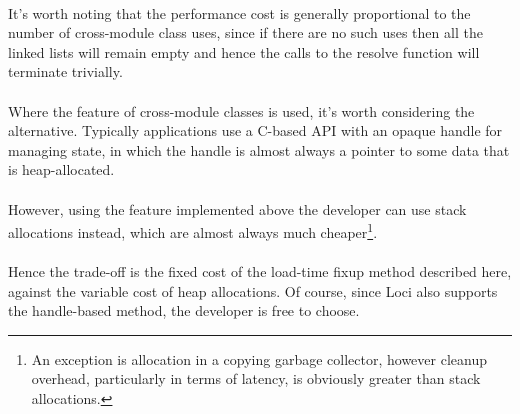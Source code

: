 \documentclass{article}
\begin{document}
\paragraph{}
It's worth noting that the performance cost is generally proportional to the number of cross-module class uses, since if there are no such uses then all the linked lists will remain empty and hence the calls to the resolve function will terminate trivially.

\paragraph{}
Where the feature of cross-module classes is used, it's worth considering the alternative. Typically applications use a C-based API with an opaque handle for managing state, in which the handle is almost always a pointer to some data that is heap-allocated.

\paragraph{}
However, using the feature implemented above the developer can use stack allocations instead, which are almost always much cheaper\footnote{An exception is allocation in a copying garbage collector, however cleanup overhead, particularly in terms of latency, is obviously greater than stack allocations.}.

\paragraph{}
Hence the trade-off is the fixed cost of the load-time fixup method described here, against the variable cost of heap allocations. Of course, since Loci also supports the handle-based method, the developer is free to choose.
\end{document}
